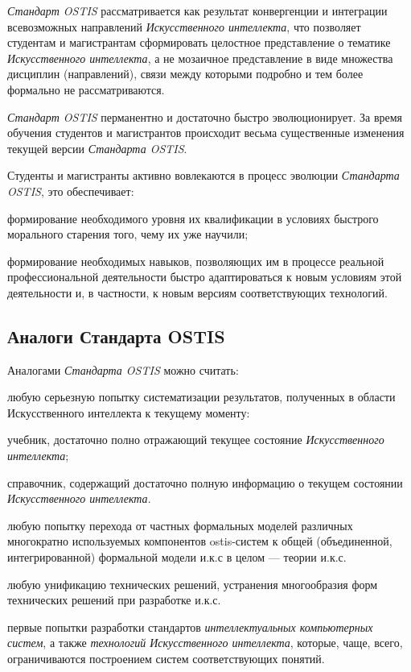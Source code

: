 \textit{Стандарт OSTIS} рассматривается как результат конвергенции и интеграции всевозможных направлений \textit{Искусственного интеллекта}, что позволяет студентам и магистрантам сформировать целостное представление о тематике \textit{Искусственного интеллекта}, а не мозаичное представление в виде множества дисциплин (направлений), связи между которыми подробно и тем более формально не рассматриваются.

\textit{Стандарт OSTIS} перманентно и достаточно быстро эволюционирует. За время обучения студентов и магистрантов происходит весьма существенные изменения текущей версии \textit{Стандарта OSTIS}.

Студенты и магистранты активно вовлекаются в процесс эволюции \textit{Стандарта OSTIS}, это обеспечивает:

\begin{textitemize}
	\item формирование необходимого уровня их квалификации в условиях быстрого морального старения того, чему их уже научили;
	\item формирование необходимых навыков, позволяющих им в процессе реальной профессиональной деятельности быстро адаптироваться к новым условиям этой деятельности и, в частности, к новым версиям соответствующих технологий.
\end{textitemize}


\subsection{Аналоги Стандарта OSTIS}
\label{standard_analogs}

Аналогами \textit{Стандарта OSTIS} можно считать:

\begin{textitemize}
	\item любую серьезную попытку систематизации результатов, полученных в области Искусственного интеллекта к текущему моменту:
	\begin{textitemize}
		\item учебник, достаточно полно отражающий текущее состояние \textit{Искусственного интеллекта};
		\item справочник, содержащий достаточно полную информацию о текущем состоянии \textit{Искусственного интеллекта}.
	\end{textitemize}
	\item любую попытку перехода от частных формальных моделей различных многократно используемых компонентов ostis-систем к общей (объединенной, интегрированной) формальной модели и.к.с в целом --- теории и.к.с.
	\item любую унификацию технических решений, устранения многообразия форм технических решений при разработке и.к.с.
	\item первые попытки разработки стандартов \textit{интеллектуальных компьютерных систем}, а также \textit{технологий Искусственного интеллекта}, которые, чаще, всего, ограничиваются построением систем соответствующих понятий.
\end{textitemize}


